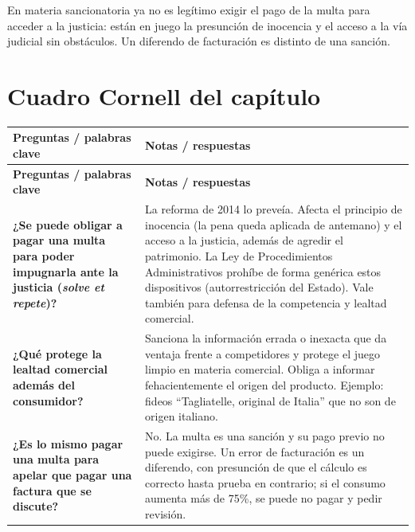 \documentclass[12pt,oneside]{book}
\begin{document}
\begin{important}
En materia sancionatoria ya no es legítimo exigir el pago de la multa para acceder a la justicia: están en juego la presunción de inocencia y el acceso a la vía judicial sin obstáculos. Un diferendo de facturación es distinto de una sanción.
\end{important}

\section{Cuadro Cornell del capítulo}

\begin{longtable}{
    >{\raggedright\arraybackslash}p{}
    !{\vrule width 0.4pt}
    >{\raggedright\arraybackslash}p{\tabcolsep-0.4pt\relax}
}
\toprule
\textbf{Preguntas / palabras clave} & \textbf{Notas / respuestas} \\
\midrule
\endfirsthead
\toprule
\textbf{Preguntas / palabras clave} & \textbf{Notas / respuestas} \\
\midrule
\endhead
\bottomrule
\endfoot
\bottomrule
\endlastfoot

\textbf{¿Se puede obligar a pagar una multa para poder impugnarla ante la justicia (\textit{solve et repete})?} &
La reforma de 2014 lo preveía. Afecta el principio de inocencia (la pena queda aplicada de antemano) y el acceso a la justicia, además de agredir el patrimonio. La Ley de Procedimientos Administrativos prohíbe de forma genérica estos dispositivos (autorrestricción del Estado). Vale también para defensa de la competencia y lealtad comercial. \\[0.6em]

\textbf{¿Qué protege la lealtad comercial además del consumidor?} &
Sanciona la información errada o inexacta que da ventaja frente a competidores y protege el juego limpio en materia comercial. Obliga a informar fehacientemente el origen del producto. Ejemplo: fideos ``Tagliatelle, original de Italia'' que no son de origen italiano. \\[0.6em]

\textbf{¿Es lo mismo pagar una multa para apelar que pagar una factura que se discute?} &
No. La multa es una sanción y su pago previo no puede exigirse. Un error de facturación es un diferendo, con presunción de que el cálculo es correcto hasta prueba en contrario; si el consumo aumenta más de 75\%, se puede no pagar y pedir revisión. \\[0.6em]


\end{longtable}
\end{document}
